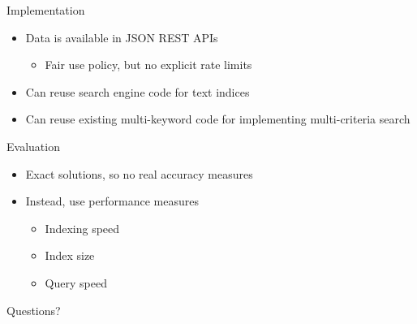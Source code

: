 \documentclass{beamer}
\begin{document}
\begin{frame}{Implementation}
	\begin{itemize}
		\item Data is available in JSON REST APIs
			\begin{itemize}
				\item Fair use policy, but no explicit rate limits
			\end{itemize}
		\item Can reuse search engine code for text indices
		\item Can reuse existing multi-keyword code for implementing multi-criteria search
	\end{itemize}
\end{frame}

\begin{frame}{Evaluation}
	\begin{itemize}
		\item Exact solutions, so no real accuracy measures
		\item Instead, use performance measures
			\begin{itemize}
				\item Indexing speed
				\item Index size
				\item Query speed
			\end{itemize}
	\end{itemize}
\end{frame}

\begin{frame}
	\Huge
	Questions?
\end{frame}
\end{document}
